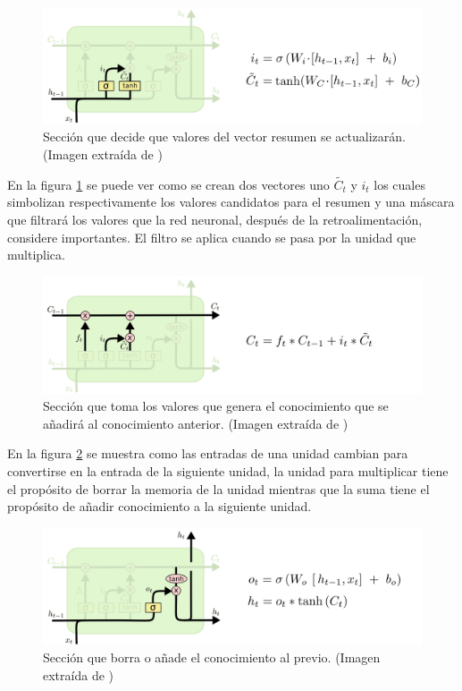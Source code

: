 \begin{figure}[H]
	\centering
	\includegraphics[width=\textwidth]{imagenes/LSTM3-focus-i.png}
	\caption[]{Sección que decide que valores del vector resumen se actualizarán. (Imagen extraída de \cite{christopher_olah_2015})}
	\label{fig:lstmAnadir}
\end{figure}


\par En la figura \ref{fig:lstmAnadir} se puede ver como se crean dos vectores uno $\widetilde{C_t}$ y $i_t$ los cuales simbolizan respectivamente los valores candidatos para el resumen y una máscara que filtrará los valores que la red neuronal, después de la retroalimentación, considere importantes. El filtro se aplica cuando se pasa por la unidad que multiplica.

\begin{figure}[H]
	\centering
	\includegraphics[width=\textwidth]{imagenes/LSTM3-focus-C.png}
	\caption[]{Sección que toma los valores que genera el conocimiento que se añadirá al conocimiento anterior. (Imagen extraída de \cite{christopher_olah_2015})}
	\label{fig:lstmSuma}
\end{figure}

\par En la figura \ref{fig:lstmSuma} se muestra como las entradas de una unidad cambian para convertirse en la entrada de la siguiente unidad, la unidad para multiplicar tiene el propósito de borrar la memoria de la unidad mientras que la suma tiene el propósito de añadir conocimiento a la siguiente unidad.

\begin{figure}[H]
	\centering
	\includegraphics[width=\textwidth]{imagenes/LSTM3-focus-o.png}
	\caption[]{Sección que borra o añade el conocimiento al previo. (Imagen extraída de \cite{christopher_olah_2015})}
	\label{fig:lstmFinal}
\end{figure}


